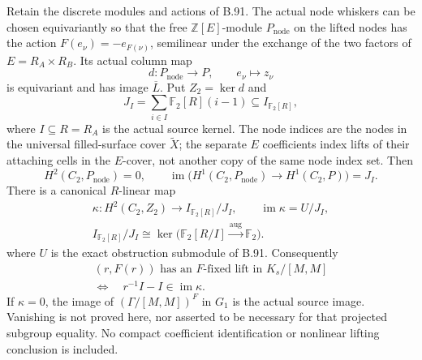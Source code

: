 \label{stmt:B92}
Retain the discrete modules and actions of B.91. The actual node whiskers
can be chosen equivariantly so that the free $\mathbb Z[E]$-module
$P_{\mathrm{node}}$ on the lifted nodes has the action
$F(e_\nu)=-e_{F(\nu)}$, semilinear under the exchange of the two
factors of $E=R_A\times R_B$. Its actual column map
\[
 d:P_{\mathrm{node}}\longrightarrow P,\qquad e_\nu\longmapsto z_\nu
\]
is equivariant and has image $\overline L$. Put $Z_2=\ker d$ and
\[
 J_I=\sum_{i\in I}\mathbb F_2[R](i-1)\subseteq I_{\mathbb F_2[R]},
\]
where $I\subseteq R=R_A$ is the actual source kernel. The node indices
are the nodes in the universal filled-surface cover $\widetilde X$;
the separate $E$ coefficients index lifts of their attaching cells
in the $E$-cover, not another copy of the same node index set. Then
\begin{equation}\label{eq:B92-node-image}
 H^2(C_2,P_{\mathrm{node}})=0,\qquad
 \operatorname{im}\bigl(H^1(C_2,P_{\mathrm{node}})
                         \longrightarrow H^1(C_2,P)\bigr)=J_I.
\end{equation}
There is a canonical $R$-linear map
\begin{equation}\label{eq:B92-kappa}
 \begin{gathered}
 \kappa:H^2(C_2,Z_2)\longrightarrow I_{\mathbb F_2[R]}/J_I
       ,\qquad \operatorname{im}\kappa=U/J_I,\\
 I_{\mathbb F_2[R]}/J_I
       \cong\ker\bigl(\mathbb F_2[R/I]\xrightarrow{\mathrm{aug}}\mathbb F_2\bigr).
 \end{gathered}
\end{equation}
where $U$ is the exact obstruction submodule of B.91. Consequently
\begin{equation}\label{eq:B92-coset-test}
 \begin{gathered}
 (r,F(r))\text{ has an $F$-fixed lift in }K_s/[M,M]
 \\
 \Longleftrightarrow\quad r^{-1}I-I\in\operatorname{im}\kappa .
 \end{gathered}
\end{equation}
If $\kappa=0$, the image of $(\Gamma/[M,M])^F$ in $G_1$ is the actual
source image. Vanishing is not proved here, nor asserted to be necessary
for that projected subgroup equality. No compact coefficient
identification or nonlinear lifting conclusion is included.


